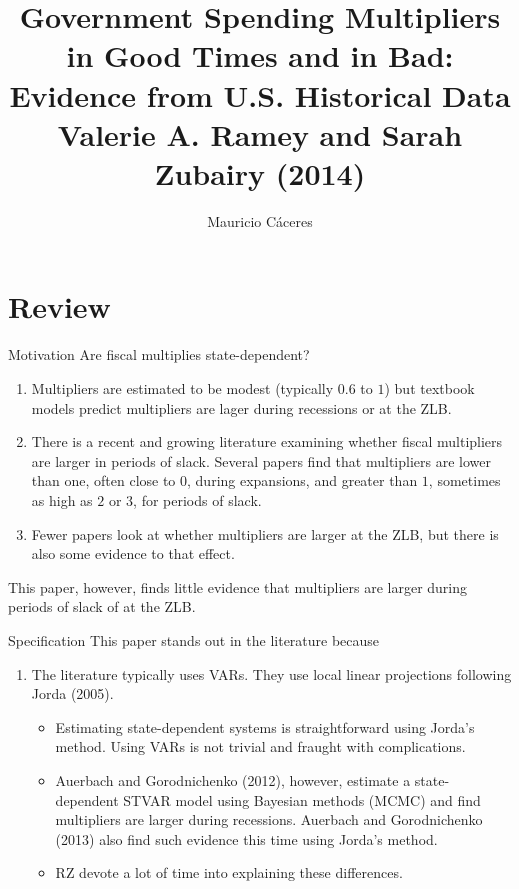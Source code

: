 \documentclass{beamer}
\title[State-Dependent Multipliers]{Government Spending Multipliers in Good Times and in Bad: Evidence from U.S. Historical Data \\ Valerie A. Ramey and Sarah Zubairy (2014)}
\author[C\'aceres]{Mauricio C\'aceres}
\begin{document}
\maketitle %

\section{Review}
\label{sec:review}

\begin{frame}{Motivation}
Are fiscal multiplies state-dependent?
\begin{enumerate}
  \item Multipliers are estimated to be modest (typically $0.6$ to $1$) but textbook models predict multipliers are lager during recessions or at the ZLB.

  \item There is a recent and growing literature examining whether fiscal multipliers are larger in periods of slack. Several papers find that multipliers are lower than one, often close to $0$, during expansions, and greater than $1$, sometimes as high as $2$ or $3$, for periods of slack.

  \item Fewer papers look at whether multipliers are larger at the ZLB, but there is also some evidence to that effect.
\end{enumerate}

This paper, however, finds little evidence that multipliers are larger during periods of slack of at the ZLB.
\end{frame}

\begin{frame}{Specification}
This paper stands out in the literature because
\begin{enumerate}
  \item The literature typically uses VARs. They use local linear projections following Jorda (2005).
    \begin{itemize}
      \item Estimating state-dependent systems is straightforward using Jorda's method. Using VARs is not trivial and fraught with complications.

      \item Auerbach and Gorodnichenko (2012), however, estimate a state-dependent STVAR model using Bayesian methods (MCMC) and find multipliers are larger during recessions. Auerbach and Gorodnichenko (2013) also find such evidence this time using Jorda's method.

      \item RZ devote a lot of time into explaining these differences.
    \end{itemize}
\end{enumerate}
\end{frame}
\end{document}
